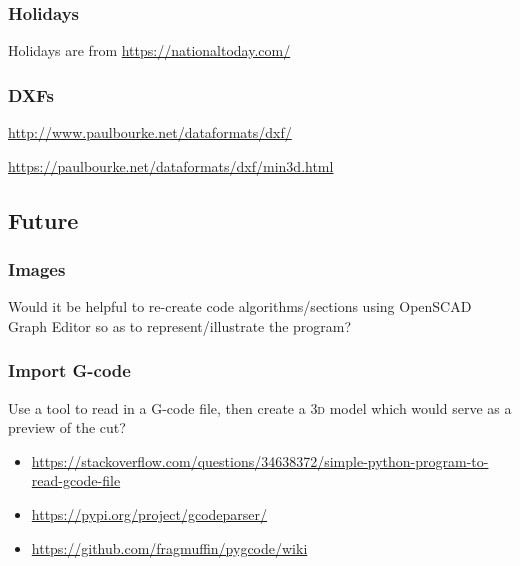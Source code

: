 \documentclass{ltxdoc}
\begin{document}

\subsubsection*{Holidays}

Holidays are from \url{https://nationaltoday.com/}

\subsubsection*{DXFs}

\url{http://www.paulbourke.net/dataformats/dxf/}

\noindent\url{https://paulbourke.net/dataformats/dxf/min3d.html}

\subsection*{Future}

\subsubsection*{Images}

Would it be helpful to re-create code algorithms/sections using OpenSCAD Graph Editor so as to represent/illustrate the program?

%

\subsubsection*{Import G-code}

Use a tool to read in a G-code file, then create a \textsc{3d} model which would serve as a preview of the cut?

\begin{itemize}
\item \url{https://stackoverflow.com/questions/34638372/simple-python-program-to-read-gcode-file}
\item \url{https://pypi.org/project/gcodeparser/}
\item \url{https://github.com/fragmuffin/pygcode/wiki}
\end{itemize} 
 
\end{document}
